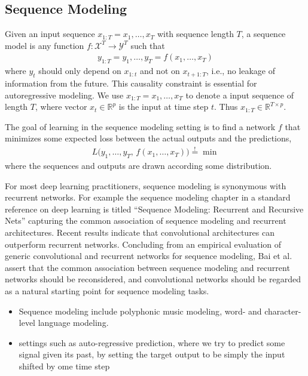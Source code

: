 \documentclass{scrartcl}
\begin{document}
\subsection{Sequence Modeling}

Given an input sequence $x_{1:T} = x_1, \dots, x_T$ with sequence length $T$, a sequence model is any function $f: \mathcal X^T \rightarrow \mathcal Y^T$ such that
\begin{align}
y_{1:T} = y_1, \dots, y_T = f(x_1,\dots, x_T)
\end{align}
where $y_t$ should only depend on $x_{1:t}$ and not on $x_{t+1:T}$, i.e., no leakage of information from the future. This causality constraint is essential for autoregressive modeling. We use $x_{1:T} = x_1, \dots, x_T$ to denote a input sequence of length $T$, where vector $x_t \in \mathbb R^p$ is the input at time step $t$. Thus $x_{1:T} \in \mathbb R^{T \times p}$.

The goal of learning in the sequence modeling setting is to find a network $f$ that minimizes some expected loss between the actual outputs and the predictions, 
\begin{align}
L \big( y_1, \dots, y_T, \, f(x_1,\dots, x_T) \big) \stackrel{\text{!}}{=} \min
\end{align}
where the sequences and outputs are drawn according some distribution.

For most deep learning practitioners, sequence modeling is synonymous with recurrent networks. For example the sequence modeling chapter in a standard reference on deep learning is titled ``Sequence Modeling: Recurrent and Recursive Nets'' \cite{Goodfellow2016} capturing the common association of sequence modeling and recurrent architectures. Recent results indicate that convolutional architectures can outperform recurrent networks. Concluding from an empirical evaluation of generic convolutional and recurrent networks for sequence modeling, Bai et al. \cite{Bai2018} assert that the common association between sequence modeling and recurrent networks should be reconsidered, and convolutional networks should be regarded as a natural starting point for sequence modeling tasks.


\begin{itemize}
\item Sequence modeling include polyphonic music modeling\cite{Oord2016}, word- and character-level language modeling.
\item settings such as auto-regressive prediction, where we try to predict some signal given its past, by setting the target output to be simply the input shifted by ome time step
\end{itemize}
\end{document}
